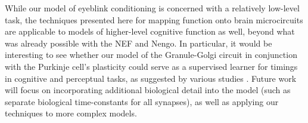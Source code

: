 While our model of eyeblink conditioning is concerned with a relatively low-level task, the techniques presented here for mapping function onto brain microcircuits are applicable to models of higher-level cognitive function as well, beyond what was already possible with the NEF and Nengo.
In particular, it would be interesting to see whether our model of the Granule-Golgi circuit in conjunction with the Purkinje cell's plasticity could serve as a supervised learner for timings in cognitive and perceptual tasks, as suggested by various studies \citep{oreilly2008cerebellum,e2014metaanalysis}.  Future work will focus on incorporating additional biological detail into the model (such as separate biological time-constants for all synapses), as well as applying our techniques to more complex models.
